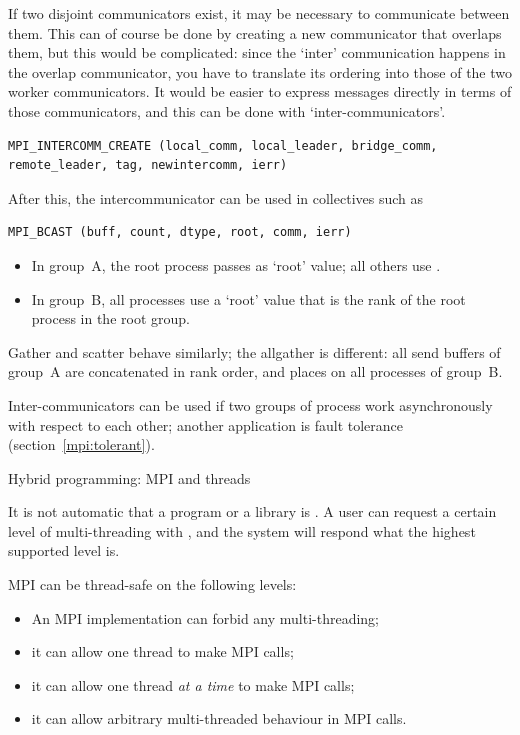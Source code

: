 If two disjoint communicators exist, it may be necessary to
communicate between them. This can of course be done by creating a new
communicator that overlaps them, but this would be complicated: since
the `inter' communication happens in the overlap communicator, you
have to translate its ordering into those of the two worker
communicators. It would be easier to express messages directly in
terms of those communicators, and this can be done with
`inter-communicators'.

\begin{verbatim}
MPI_INTERCOMM_CREATE (local_comm, local_leader, bridge_comm, remote_leader, tag, newintercomm, ierr)
\end{verbatim}
After this, the intercommunicator can be used in collectives such as
\begin{verbatim}
MPI_BCAST (buff, count, dtype, root, comm, ierr)
\end{verbatim}
\begin{itemize}
\item In group~A, the root process passes  as
  `root' value; all others use .
\item In group~B, all processes use a `root' value that is the
  rank of the root process in the root group.
\end{itemize}
Gather and scatter behave similarly; the allgather is different: all
send buffers of group~A are concatenated in rank order, and places on
all processes of group~B.

Inter-communicators can be used if two groups of process work
asynchronously with respect to each other; another application is
fault tolerance (section~\ref{mpi:tolerant}).


 {Hybrid programming: MPI and threads}\

It is not automatic that a program or a library is
.  A user can request a certain level of
multi-threading with , and the system
will respond what the highest supported level is.

MPI can be thread-safe on the following levels:
\begin{itemize}
\item An MPI implementation can forbid any multi-threading;
\item it can allow one thread to make MPI calls;
\item it can allow one thread \emph{at a time} to make MPI calls;
\item it can allow arbitrary multi-threaded behaviour in MPI calls.
\end{itemize}

